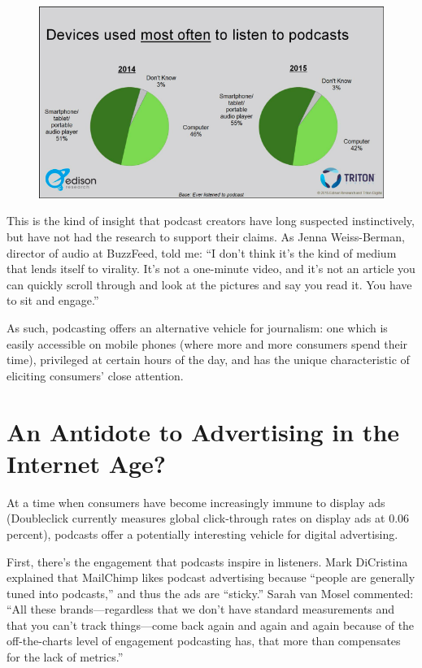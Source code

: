 \documentclass[notoc, symmetric, nobib, nols]{towcenter-guideto-book}
\begin{document}
\begin{figure}
\begin{centering}
\includegraphics[width=.9\textwidth]{graphics/PODCAST15_EdInfinite_devices.png}
\caption{}
\end{centering}
\end{figure}

This is the kind of insight that podcast creators have long suspected instinctively, but have not had the research to support their claims. As Jenna Weiss-Berman, director of audio at BuzzFeed, told me: ``I don't think it's the kind of medium that lends itself to virality. It's not a one-minute video, and it's not an article you can quickly scroll through and look at the pictures and say you read it. You have to sit and engage.''\autocite{wb}

As such, podcasting offers an alternative vehicle for journalism: one which is easily accessible on mobile phones (where more and more consumers spend their time), privileged at certain hours of the day, and has the unique characteristic of eliciting consumers' close attention. 


\section{An Antidote to Advertising in the Internet Age?} 
At a time when consumers have become increasingly immune to display ads (Doubleclick currently measures global click-through rates on display ads at 0.06 percent), podcasts offer a potentially interesting vehicle for digital advertising.\autocite{ctr}

First, there's the engagement that podcasts inspire in listeners. Mark DiCristina explained that MailChimp likes podcast advertising because ``people are generally tuned into podcasts,'' and thus the ads are ``sticky.''\autocite{mailchimp} Sarah van Mosel commented: ``All these brands---regardless that we don't have standard measurements and that you can't track things---come back again and again and again because of the off-the-charts level of engagement podcasting has, that more than compensates for the lack of metrics.''\autocite{mosel}
\end{document}
